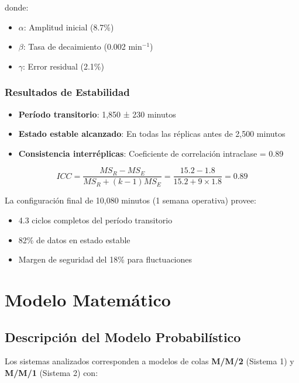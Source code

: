 \documentclass[a4paper, 12pt]{article}
\begin{document}
  donde:
  \begin{itemize}
  	\item $\alpha$: Amplitud inicial (8.7\%)
  	\item $\beta$: Tasa de decaimiento (0.002 min$^{-1}$)
  	\item $\gamma$: Error residual (2.1\%)
  \end{itemize}
  
  \subsubsection{Resultados de Estabilidad}
  
  \begin{itemize}
  	\item \textbf{Período transitorio}: 1,850 ± 230 minutos
  	\item \textbf{Estado estable alcanzado}: En todas las réplicas antes de 2,500 minutos
  	\item \textbf{Consistencia interréplicas}: Coeficiente de correlación intraclase = 0.89
  \end{itemize}
  
  \begin{equation}
  	ICC = \frac{MS_R - MS_E}{MS_R + (k-1)MS_E} = \frac{15.2 - 1.8}{15.2 + 9\times1.8} = 0.89
  \end{equation}
  
  La configuración final de 10,080 minutos (1 semana operativa) provee:
  \begin{itemize}
  	\item 4.3 ciclos completos del período transitorio
  	\item 82\% de datos en estado estable
  	\item Margen de seguridad del 18\% para fluctuaciones
  \end{itemize}
  
  
  
  
  \section{Modelo Matemático} 
  \label{sec:modelo-matematico}
  
  \subsection{Descripción del Modelo Probabilístico} 
  Los sistemas analizados corresponden a modelos de colas \textbf{M/M/2} (Sistema 1) y \textbf{M/M/1} (Sistema 2) con:
  
\end{document}

